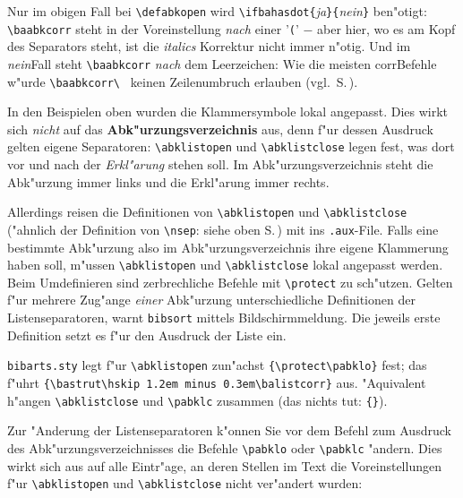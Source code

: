 \documentclass[12pt,a4paper]{article}
\begin{document}
\noindent
Nur im obigen Fall bei \verb|\defabkopen| wird
\verb|\ifbahasdot{|\textit{ja}\verb|}{|\textit{nein}\verb|}| 
ben"otigt: \verb|\baabkcorr| steht in der Voreinstellung 
\textit{nach} einer '\verb|(|' $-$ aber hier, wo
es am Kopf des Separators steht, ist die \textit{italics}\hy 
Korrektur nicht immer n"otig. Und im \textit{nein}\hy Fall 
steht \verb|\baabkcorr| \textit{nach} dem Leerzeichen:
Wie die meisten corr\hy Befehle w"urde \verb*|\baabkcorr\ | 
keinen Zeilenumbruch erlauben (vgl.\ S.\,\pageref{Systematik}).

\vspace{1ex}\noindent
In den Beispielen oben wurden die Klammersymbole lokal angepasst.
Dies wirkt sich \textit{nicht} auf das \textbf{Abk"urzungsverzeichnis} 
aus, denn f"ur dessen Ausdruck gelten eigene 
Separatoren: \verb|\abklistopen| und \verb|\abklistclose| 
legen fest, was dort vor und nach der \textit{Erkl"arung}
\label{Erklaerung} stehen soll. Im Abk"urzungsverzeichnis 
steht die Abk"urzung immer links und die Erkl"arung immer rechts.

Allerdings reisen die Definitionen von
\verb|\abklistopen| und \verb|\abklistclose| 
("ahnlich der Definition von \verb|\nsep|\hspace{.075em}: siehe
oben S.\,\pageref{Ausreise}) mit ins \hspace{-.15em}
\verb|.aux|-File. Falls eine bestimmte Abk"urzung also
im Abk"urzungsverzeichnis ihre eigene Klammerung haben soll,
m"ussen \verb|\abklistopen| und \verb|\abklistclose| lokal
angepasst werden. Beim Umdefinieren sind zerbrechliche 
Befehle mit \verb|\protect| zu sch"utzen. Gelten f"ur
mehrere Zug"ange \textit{einer} Abk"urzung unterschiedliche Definitionen
der Listenseparatoren, warnt \texttt{bibsort} mittels
Bildschirmmeldung. Die jeweils erste Definition setzt es f"ur
den Ausdruck der Liste ein.

\verb|bibarts.sty| 
legt f"ur \verb|\abklistopen| zun"achst \verb|{\protect\pabklo}| fest; 
das f"uhrt \verb|{\bastrut\hskip 1.2em minus 0.3em\balistcorr}| aus. 
"Aquivalent h"angen \verb|\abklistclose|
und \verb|\pabklc| zusammen (das nichts tut: \verb|{}|). 

Zur "Anderung der Listenseparatoren k"onnen Sie vor dem Befehl zum Ausdruck
des Abk"urzungsverzeichnisses die Befehle \verb|\pabklo| oder
\verb|\pabklc| "andern. Dies wirkt sich aus auf alle Eintr"age,
an deren Stellen im Text die Voreinstellungen f"ur
\verb|\abklistopen| und \verb|\abklistclose| nicht ver"andert wurden:

\vspace{-.25ex}{\small
\begin{verbatim}
  {\renewcommand{\pabklo}{\bastrut\ \balistcorr =\ }
   \renewcommand{\pabklc}{!} %% ^^ \bastrut\ erlaubt Umbruch nach .
   \renewcommand{\abklistemph}{\itshape}
   \showbacorr \small \printnumabklist}
\end{verbatim}}
\end{document}
